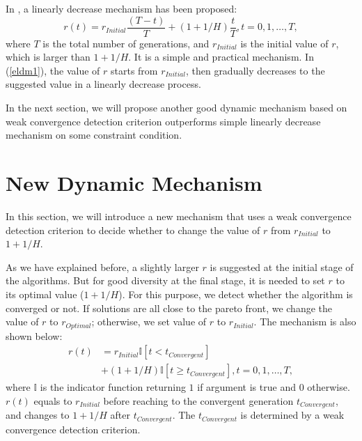\documentclass[conference]{IEEEtran}
\begin{document}
In \cite{hisao:dynamic}, a linearly decrease mechanism has been proposed:
\begin{equation}\label{eldm1}
  r(t)=r_{Initial}\frac{(T-t)}{T}+(1+1/H)\frac{t}{T}, t=0,1,\dots,T,
\end{equation}
where $T$ is the total number of generations, and $r_{Initial}$ is the initial value of $r$,
which is larger than $1+1/H$.
It is a simple and practical mechanism. In (\ref{eldm1}), the value of $r$ starts from $r_{Initial}$,
then gradually decreases to the suggested value in a linearly decrease process. 

In the next section, we will propose another good dynamic mechanism based on weak convergence 
detection criterion outperforms simple linearly decrease mechanism on some constraint condition.

% 
\section{New Dynamic Mechanism}
In this section,
we will introduce a new mechanism that uses a weak convergence detection criterion to 
decide whether to change the value of $r$ from $r_{Initial}$ to $1+1/H$. 

As we have explained before, 
a slightly larger $r$ is suggested at the initial stage of the algorithms. 
But for good diversity at the final stage,
it is needed to set $r$ to its optimal value ($1+1/H$). 
For this purpose, we detect whether the algorithm is converged or not.  
If solutions are all close to the pareto front, 
we change the value of $r$ to $r_{Optimal}$; otherwise, we set value of $r$ to 
$r_{Initial}$. The mechanism is also shown below:
\begin{equation}\begin{aligned}\label{endm1}
  r(t)&=r_{Initial}\mathbb{I}\left[t<t_{Convergent}\right]\\
  &+(1+1/H)\mathbb{I}\left[t \ge t_{Convergent}\right], t=0,1,\dots,T,
\end{aligned}
\end{equation}
where $\mathbb{I}$ is the indicator function returning $1$ if argument is true and $0$ otherwise.
$r(t)$ equals to $r_{Initial}$ before reaching to the convergent generation $t_{Convergent}$,
and changes to $1+1/H$ after $t_{Convergent}$. 
The $t_{Convergent}$ is determined by a weak convergence detection criterion. 
\end{document}
